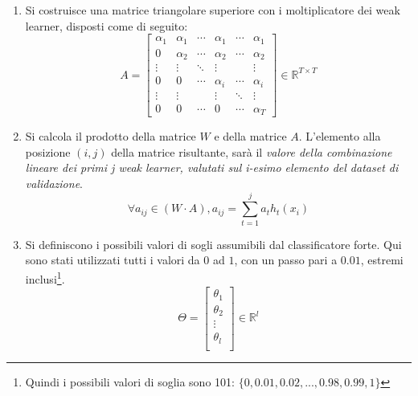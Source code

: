 \begin{enumerate}
                \item Si costruisce una matrice triangolare superiore con i moltiplicatore dei weak learner, disposti come di seguito:
                \begin{equation}
                    \label{subeq:wl_multipliers_matrix}
                    A = \left[
                    \begin{array}{cccccc}
                        \alpha_1 & \alpha_1 & \cdots & \alpha_1 & \cdots & \alpha_1 \\
                        0 & \alpha_2 & \cdots & \alpha_2 & \cdots & \alpha_2 \\
                        \vdots & \vdots & \ddots & \vdots & & \vdots \\
                        0 & 0 & \cdots & \alpha_i & \cdots & \alpha_i \\
                        \vdots & \vdots & & \vdots  & \ddots & \vdots \\
                        0 & 0 & \cdots & 0 & \cdots & \alpha_T
                    \end{array}
                    \right] \in \mathbb{R}^{T \times T}
                \end{equation}

                \item Si calcola il prodotto della matrice $W$ e della matrice $A$. L'elemento alla posizione $(i,j)$ della matrice risultante, sarà il \emph{valore della combinazione lineare dei primi j weak learner, valutati sul i-esimo elemento del dataset di validazione}.
                \begin{equation}
                    \label{subeq:wca}
                    \forall a_{ij} \in (W \cdot A), 
                    a_{ij} = \sum_{t = 1}^{j} a_t h_t(x_i)
                \end{equation}

                \item Si definiscono i possibili valori di sogli assumibili dal classificatore forte. Qui sono stati utilizzati tutti i valori da $0$ ad $1$, con un passo pari a $0.01$, estremi inclusi\footnote{Quindi i possibili valori di soglia sono 101: $\{0, 0.01, 0.02, ..., 0.98, 0.99, 1\}$}.
                \begin{equation}
                    \label{subeq:thresholds_vector}
                    \Theta = \left[
                    \begin{array}{c}
                        \theta_1 \\
                        \theta_2 \\
                        \vdots \\
                        \theta_l \\
                    \end{array}
                    \right] \in \mathbb{R}^l
                \end{equation}


\end{enumerate}
